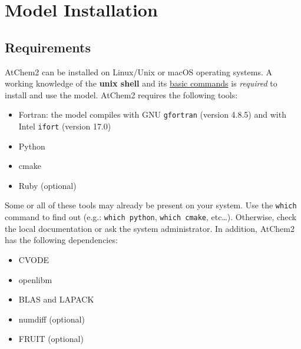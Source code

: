 %
%
%
%

\chapter{Model Installation} \label{ch:installation}

\section{Requirements} \label{sec:requirements}

AtChem2 can be installed on Linux/Unix or macOS operating systems. A
working knowledge of the \textbf{unix shell} and its
\href{https://swcarpentry.github.io/shell-novice/reference/}{basic commands}
is \emph{required} to install and use the model. AtChem2 requires the
following tools:

\begin{itemize}
\item Fortran: the model compiles with GNU \texttt{gfortran} (version
  4.8.5) and with Intel \texttt{ifort} (version 17.0)
\item Python
\item cmake
\item Ruby (optional)
\end{itemize}

Some or all of these tools may already be present on your system. Use
the \texttt{which} command to find out (e.g.: \verb|which python|,
\verb|which cmake|, etc\ldots). Otherwise, check the local
documentation or ask the system administrator. In addition, AtChem2
has the following dependencies:

\begin{itemize}
\item CVODE
\item openlibm
\item BLAS and LAPACK
\item numdiff (optional)
\item FRUIT (optional)
\end{itemize}

